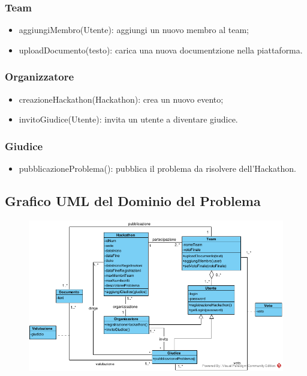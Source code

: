 \documentclass[a4paper, 15pt, oneside]{article}
\begin{document}
	\subsubsection{Team}
	\begin{itemize}
		\item aggiungiMembro(Utente): aggiungi un nuovo membro al team;
		\item uploadDocumento(testo): carica una nuova documentzione nella piattaforma.
	\end{itemize}
	\subsubsection{Organizzatore}
	\begin{itemize}
		\item creazioneHackathon(Hackathon): crea un nuovo evento;
		\item invitoGiudice(Utente): invita un utente a diventare giudice.
	\end{itemize}
	\subsubsection{Giudice}
	\begin{itemize}
		\item pubblicazioneProblema(): pubblica il problema da risolvere dell'Hackathon.
	\end{itemize}
	\subsection{Grafico UML del Dominio del Problema}
	\begin{figure}[H]
		\includegraphics[width=1\textwidth]{../Immagini/Homework1_UMLObject}
	\end{figure}
	
\end{document}
